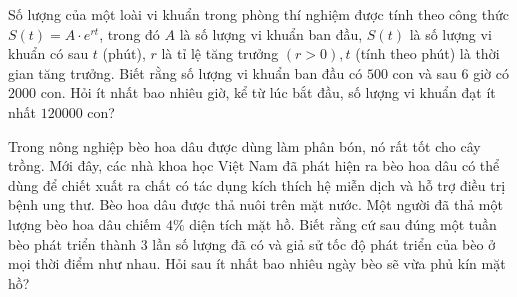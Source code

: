 
\begin{bt}%
	Số lượng của một loài vi khuẩn trong phòng thí nghiệm được tính theo công thức $S(t)=A\cdot e^{rt}$, trong đó $A$ là số lượng vi khuẩn ban đầu, $S(t)$ là số lượng vi khuẩn có sau $t$ (phút), $r$  là tỉ lệ tăng trưởng $(r>0), t$ (tính theo phút) là thời gian tăng trưởng. Biết rằng số lượng vi khuẩn ban đầu có $500$ con và sau $6$ giờ có $2000$ con. Hỏi ít nhất bao nhiêu giờ, kể từ lúc bắt đầu, số lượng vi khuẩn đạt ít nhất $120000$ con?
\end{bt}

\begin{bt}%
	Trong nông nghiệp bèo hoa dâu được dùng làm phân bón, nó rất tốt cho cây trồng. Mới đây, các nhà khoa học Việt Nam đã phát hiện ra  bèo hoa dâu có thể dùng để chiết xuất ra chất có tác dụng kích thích hệ miễn dịch và hỗ trợ điều trị bệnh ung thư. Bèo hoa dâu được thả nuôi trên mặt nước. Một người đã thả một lượng bèo hoa dâu chiếm $4\%$ diện tích mặt hồ. Biết rằng cứ sau đúng một tuần bèo phát triển thành 3 lần số lượng đã có và giả sử tốc độ phát triển của bèo ở mọi thời điểm như nhau. Hỏi sau ít nhất bao nhiêu ngày bèo sẽ vừa phủ kín mặt hồ?
\end{bt}

